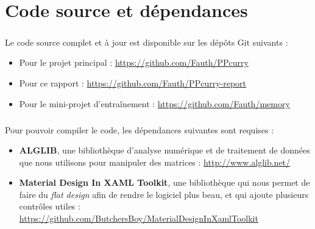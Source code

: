 \chapter{Code source et dépendances}

\paragraph{}Le code source complet et à jour est disponible sur les dépôts Git suivants :
\begin{itemize}
	\item Pour le projet principal : \url{https://github.com/Fauth/PPcurry}
	\item Pour ce rapport : \url{https://github.com/Fauth/PPcurry-report}
	\item Pour le mini-projet d'entraînement : \url{https://github.com/Fauth/memory}
\end{itemize}

\paragraph{}Pour pouvoir compiler le code, les dépendances suivantes sont requises :
\begin{itemize}
	\item \textbf{ALGLIB}, une bibliothèque d'analyse numérique et de traitement de données que nous utilisons pour manipuler des matrices : \url{http://www.alglib.net/}
	\item \textbf{Material Design In XAML Toolkit}, une bibliothèque qui nous permet de faire du \textit{flat design} afin de rendre le logiciel plus beau, et qui ajoute plusieurs contrôles utiles : \url{https://github.com/ButchersBoy/MaterialDesignInXamlToolkit}
\end{itemize}